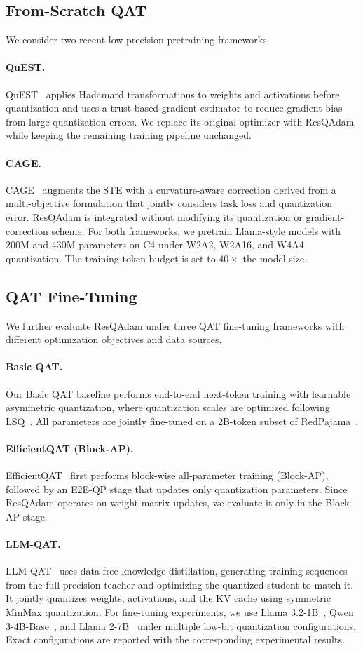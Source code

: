 \documentclass{article} %
\begin{document}
\subsection{From-Scratch QAT}
We consider two recent low-precision pretraining frameworks.
\paragraph{QuEST.}
QuEST~\citep{panferov2025quest} applies Hadamard transformations to weights and activations before quantization and uses a trust-based gradient estimator to reduce gradient bias from large quantization errors. We replace its original optimizer with ResQAdam while keeping the remaining training pipeline unchanged.
\paragraph{CAGE.}
CAGE~\citep{tabesh2025cage} augments the STE with a curvature-aware correction derived from a multi-objective formulation that jointly considers task loss and quantization error. ResQAdam is integrated without modifying its quantization or gradient-correction scheme.
For both frameworks, we pretrain Llama-style models with 200M and 430M parameters on C4 under W2A2, W2A16, and W4A4 quantization. The training-token budget is set to $40\times$ the model size.
\subsection{QAT Fine-Tuning}
We further evaluate ResQAdam under three QAT fine-tuning frameworks with different optimization objectives and data sources.
\paragraph{Basic QAT.}
Our Basic QAT baseline performs end-to-end next-token training with learnable asymmetric quantization, where quantization scales are optimized following LSQ~\citep{esser2019learned}. All parameters are jointly fine-tuned on a 2B-token subset of RedPajama~\citep{together2023redpajama}.
\paragraph{EfficientQAT (Block-AP).}
EfficientQAT~\citep{chen2025efficientqat} first performs block-wise all-parameter training (Block-AP), followed by an E2E-QP stage that updates only quantization parameters. Since ResQAdam operates on weight-matrix updates, we evaluate it only in the Block-AP stage.
\paragraph{LLM-QAT.}
LLM-QAT~\citep{liu2024llmqat} uses data-free knowledge distillation, generating training sequences from the full-precision teacher and optimizing the quantized student to match it. It jointly quantizes weights, activations, and the KV cache using symmetric MinMax quantization.
For fine-tuning experiments, we use Llama 3.2-1B~\citep{llama3modelcard}, Qwen 3-4B-Base~\citep{qwen3technicalreport}, and Llama 2-7B~\citep{touvron2023llama} under multiple low-bit quantization configurations. Exact configurations are reported with the corresponding experimental results.
\end{document}

